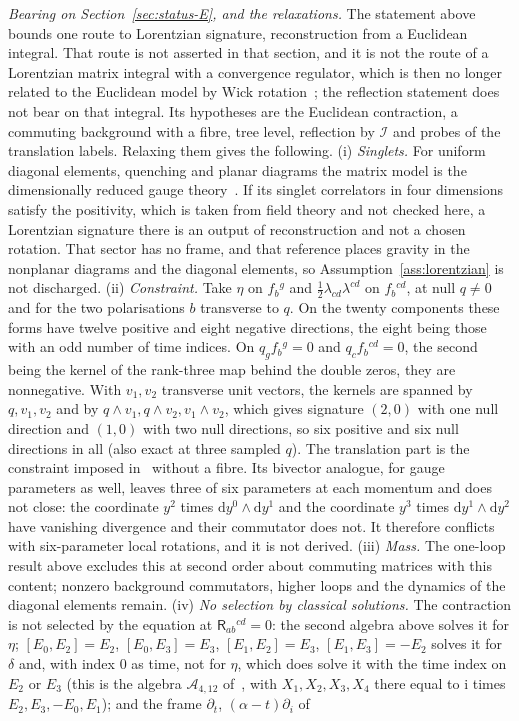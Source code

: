 \emph{Bearing on Section~\ref{sec:status-E}, and the relaxations.} The statement above bounds one route to Lorentzian signature, reconstruction from a Euclidean integral. That route is not asserted in that section, and it is not the route of a Lorentzian matrix integral with a convergence regulator, which is then no longer related to the Euclidean model by Wick rotation~\cite{Steinacker2026Invitation}; the reflection statement does not bear on that integral. Its hypotheses are the Euclidean contraction, a commuting background with a fibre, tree level, reflection by \(\mathcal I\) and probes of the translation labels. Relaxing them gives the following. (i) \emph{Singlets.} For uniform diagonal elements, quenching and planar diagrams the matrix model is the dimensionally reduced gauge theory~\cite{HoKawaiSteinacker2025}. If its singlet correlators in four dimensions satisfy the positivity, which is taken from field theory and not checked here, a Lorentzian signature there is an output of reconstruction and not a chosen rotation. That sector has no frame, and that reference places gravity in the nonplanar diagrams and the diagonal elements, so Assumption~\ref{ass:lorentzian} is not discharged. (ii) \emph{Constraint.} Take \(\eta\) on \(f_b{}^g\) and \(\tfrac12\lambda_{cd}\lambda^{cd}\) on \(f_b{}^{cd}\), at null \(q\neq0\) and for the two polarisations \(b\) transverse to \(q\). On the twenty components these forms have twelve positive and eight negative directions, the eight being those with an odd number of time indices. On \(q_gf_b{}^g=0\) and \(q_cf_b{}^{cd}=0\), the second being the kernel of the rank-three map behind the double zeros, they are nonnegative. With \(v_1,v_2\) transverse unit vectors, the kernels are spanned by \(q,v_1,v_2\) and by \(q\wedge v_1,q\wedge v_2,v_1\wedge v_2\), which gives signature \((2,0)\) with one null direction and \((1,0)\) with two null directions, so six positive and six null directions in all (also exact at three sampled \(q\)). The translation part is the constraint imposed in~\cite{HoKawaiSteinacker2025} without a fibre. Its bivector analogue, for gauge parameters as well, leaves three of six parameters at each momentum and does not close: the coordinate \(y^2\) times \(\mathrm dy^0\wedge\mathrm dy^1\) and the coordinate \(y^3\) times \(\mathrm dy^1\wedge\mathrm dy^2\) have vanishing divergence and their commutator does not. It therefore conflicts with six-parameter local rotations, and it is not derived. (iii) \emph{Mass.} The one-loop result above excludes this at second order about commuting matrices with this content; nonzero background commutators, higher loops and the dynamics of the diagonal elements remain. (iv) \emph{No selection by classical solutions.} The contraction is not selected by the equation at \(\mathsf R_{ab}{}^{cd}=0\): the second algebra above solves it for \(\eta\); \([E_0,E_2]=E_2\), \([E_0,E_3]=E_3\), \([E_1,E_2]=E_3\), \([E_1,E_3]=-E_2\) solves it for \(\delta\) and, with index \(0\) as time, not for \(\eta\), which does solve it with the time index on \(E_2\) or \(E_3\) (this is the algebra \(\mathcal A_{4,12}\) of~\cite{Chatzistavrakidis2011}, with \(X_1,X_2,X_3,X_4\) there equal to \(\mathrm i\) times \(E_2,E_3,-E_0,E_1\)); and the frame \(\partial_t\), \((\alpha-t)\partial_i\) of~\cite{IsonoTomino2010} 